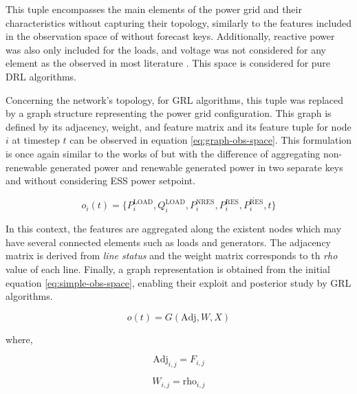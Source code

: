 \begin{description}
	This tuple encompasses the main elements of the power grid and their characteristics without capturing their topology, similarly to the features included in the observation space of \cite{hanAutonomousControlTechnology2023} without forecast keys. Additionally, reactive power was also only included for the loads, and voltage was not considered for any element as the observed in most literature \cite{liNovelGraphReinforcement2022, chenScalableGraphReinforcement2023, liuDistributedEconomicDispatch2018, leiDynamicEnergyDispatch2021, yangDynamicEnergyDispatch2021, xingRealtimeOptimalScheduling2023}. This space is considered for pure \ac{DRL} algorithms. \par 
	Concerning the network's topology, for \ac{GRL} algorithms, this tuple was replaced by a graph structure representing the power grid configuration. This graph is defined by its adjacency, weight, and feature matrix and its feature tuple for node $i$ at timestep $t$ can be observed in equation \ref{eq:graph-obs-space}. This formulation is once again similar to the works of \cite{liNovelGraphReinforcement2022, chenScalableGraphReinforcement2023} but with the difference of aggregating non-renewable generated power and renewable generated power in two separate keys and without considering \ac{ESS} power setpoint.
	
	\begin{equation} \label{eq:graph-obs-space}
		o_i(t) = \{P^\text{LOAD}_i, Q^\text{LOAD}_i, P^\text{NRES}_i, P^\text{RES}_i, \overline{P^\text{RES}_i}, t\}
	\end{equation}
	
	In this context, the features are aggregated along the existent nodes which may have several connected elements such as loads and generators. The adjacency matrix is derived from \textit{line status} and the weight matrix corresponds to th \textit{rho} value of each line. Finally, a graph representation is obtained from the initial equation \ref{eq:simple-obs-space}, enabling their exploit and posterior study by \ac{GRL} algorithms.
	
	\begin{equation}
		o(t) = G(\text{Adj}, W, X)
	\end{equation}
	
	where,
	
	\begin{equation}
		\text{Adj}_{i,j} = F_{i,j}
	\end{equation}
	
	\begin{equation}
		W_{i,j} = \text{rho}_{i,j}
	\end{equation}
	

\end{description}
